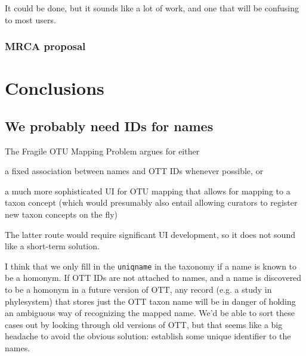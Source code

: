 \documentclass[11pt]{article}
\newcommand{\fragileOTUMapping}{Fragile OTU Mapping Problem\xspace}
\begin{document}
It could be done, but it sounds like a lot of work, and one that will be confusing to
  most users.

\subsubsection{MRCA proposal}

\section{Conclusions}
\subsection{We probably need IDs for names}
The \fragileOTUMapping argues for either
\begin{compactenum}
  \item a fixed association between names and OTT IDs whenever possible, or
  \item a much more sophisticated UI for OTU mapping that allows for mapping
    to a taxon concept (which would presumably also entail allowing curators to
    register new taxon concepts on the fly)
\end{compactenum}
The latter route would require significant UI development, so 
  it does not sound like a short-term solution.

I think that we only fill in the {\tt uniqname} in the taxonomy if 
  a name is known to be a homonym.
If OTT IDs are not attached to names, and a name is discovered to be a homonym
  in a future version of OTT,
  any record (e.g. a study in phylesystem) that stores just the OTT
  taxon name will be in danger of holding an ambiguous way of recognizing the
  mapped name.
We'd be able to sort these cases out by looking through old versions of OTT, but
  that seems like a big headache to avoid the obvious solution: establish some
  unique identifier to the names.



\end{document}
